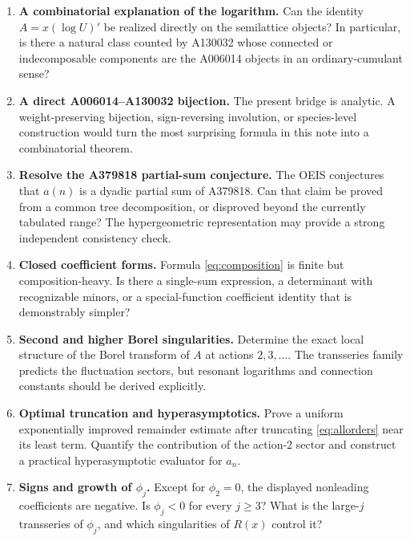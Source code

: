 \documentclass[11pt,a4paper]{article}
\theoremstyle{definition}
\theoremstyle{remark}
\begin{document}
\begin{enumerate}[label=\textbf{Q\arabic*.}]
\item \label{q:bijection}\textbf{A combinatorial explanation of the logarithm.}
Can the identity \(A=x(\log U)'\) be realized directly on the semilattice objects?  In particular, is there a natural class counted by A130032 whose connected or indecomposable components are the A006014 objects in an ordinary-cumulant sense?

\item \textbf{A direct A006014--A130032 bijection.}
The present bridge is analytic.  A weight-preserving bijection, sign-reversing involution, or species-level construction would turn the most surprising formula in this note into a combinatorial theorem.

\item \textbf{Resolve the A379818 partial-sum conjecture.}
The OEIS conjectures that \(a(n)\) is a dyadic partial sum of A379818.  Can that claim be proved from a common tree decomposition, or disproved beyond the currently tabulated range?  The hypergeometric representation may provide a strong independent consistency check.

\item \textbf{Closed coefficient forms.}
Formula \eqref{eq:composition} is finite but composition-heavy.  Is there a single-sum expression, a determinant with recognizable minors, or a special-function coefficient identity that is demonstrably simpler?

\item \textbf{Second and higher Borel singularities.}
Determine the exact local structure of the Borel transform of \(A\) at actions \(2,3,\ldots\).  The transseries family predicts the fluctuation sectors, but resonant logarithms and connection constants should be derived explicitly.

\item \textbf{Optimal truncation and hyperasymptotics.}
Prove a uniform exponentially improved remainder estimate after truncating \eqref{eq:allorders} near its least term.  Quantify the contribution of the action-2 sector and construct a practical hyperasymptotic evaluator for \(a_n\).

\item \textbf{Signs and growth of \(\phi_j\).}
Except for \(\phi_2=0\), the displayed nonleading coefficients are negative.  Is \(\phi_j<0\) for every \(j\ge3\)?  What is the large-\(j\) transseries of \(\phi_j\), and which singularities of \(R(x)\) control it?


\end{enumerate}
\end{document}
